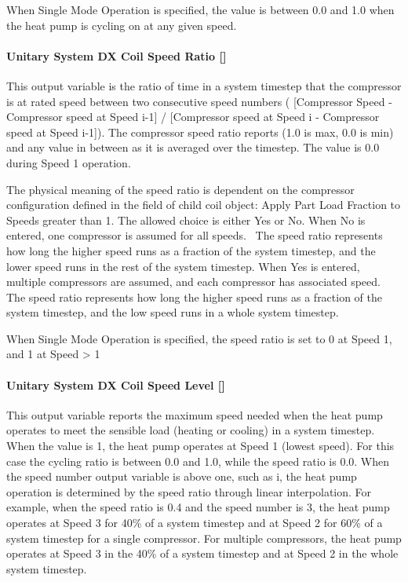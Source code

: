 When Single Mode Operation is specified, the value is between 0.0 and 1.0 when the heat pump is cycling on at any given speed.

\paragraph{Unitary System DX Coil Speed Ratio {[]}}\label{unitary-system-dx-coil-speed-ratio-1}

This output variable is the ratio of time in a system timestep that the compressor is at rated speed between two consecutive speed numbers ( {[}Compressor Speed - Compressor speed at Speed i-1{]} / {[}Compressor speed at Speed i - Compressor speed at Speed i-1{]}). The compressor speed ratio reports (1.0 is max, 0.0 is min) and any value in between as it is averaged over the timestep. The value is 0.0 during Speed 1 operation.

The physical meaning of the speed ratio is dependent on the compressor configuration defined in the field of child coil object: Apply Part Load Fraction to Speeds greater than 1. The allowed choice is either Yes or No. When No is entered, one compressor is assumed for all speeds. ~The speed ratio represents how long the higher speed runs as a fraction of the system timestep, and the lower speed runs in the rest of the system timestep. When Yes is entered, multiple compressors are assumed, and each compressor has associated speed. The speed ratio represents how long the higher speed runs as a fraction of the system timestep, and the low speed runs in a whole system timestep.

When Single Mode Operation is specified, the speed ratio is set to 0 at Speed 1, and 1 at Speed \textgreater{} 1

\paragraph{Unitary System DX Coil Speed Level {[]}}\label{unitary-system-dx-coil-speed-level-1}

This output variable reports the maximum speed needed when the heat pump operates to meet the sensible load (heating or cooling) in a system timestep. When the value is 1, the heat pump operates at Speed 1 (lowest speed). For this case the cycling ratio is between 0.0 and 1.0, while the speed ratio is 0.0. When the speed number output variable is above one, such as i, the heat pump operation is determined by the speed ratio through linear interpolation. For example, when the speed ratio is 0.4 and the speed number is 3, the heat pump operates at Speed 3 for 40\% of a system timestep and at Speed 2 for 60\% of a system timestep for a single compressor. For multiple compressors, the heat pump operates at Speed 3 in the 40\% of a system timestep and at Speed 2 in the whole system timestep.


